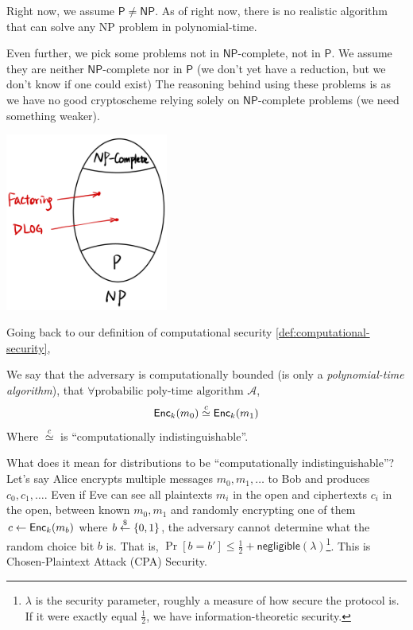 Right now, we assume $\mathsf{P}\neq\mathsf{NP}$. As of right now, there is no realistic algorithm that can solve any \textsf{NP} problem in polynomial-time.

Even further, we pick some problems not in $\mathsf{NP}$-complete, not in $\mathsf{P}$. We assume they are neither $\mathsf{NP}$-complete nor in $\mathsf{P}$ (we don't yet have a reduction, but we don't know if one could exist) The reasoning behind using these problems is as we have no good cryptoscheme relying solely on $\mathsf{NP}$-complete problems (we need something weaker).

\begin{center}
    \includegraphics[width=0.4\textwidth]{images/2023-01-31/pnp-venn.png}
\end{center}

Going back to our definition of computational security \cref{def:computational-security},
\begin{definition*}
    We say that the adversary is computationally bounded (is only a \emph{polynomial-time algorithm}), that $\forall \text{probabilic poly-time algorithm }\mathcal{A}$,
    \[\operatorname{\mathsf{Enc}}_k(m_0)\overset{c}{\simeq}\operatorname{\mathsf{Enc}}_k(m_1)\]
    Where $\overset{c}{\simeq}$ is ``computationally indistinguishable''.
\end{definition*}

What does it mean for distributions to be ``computationally indistinguishable''? Let's say Alice encrypts multiple messages $m_0, m_1, \dots$ to Bob and produces $c_0, c_1, \dots$. Even if Eve can see all plaintexts $m_i$ in the open and ciphertexts $c_i$ in the open, between known $m_0, m_1$ and randomly encrypting one of them $c\leftarrow \operatorname{\mathsf{Enc}}_{k}(m_b)$ where $b\overset{\$}{\leftarrow} \{0, 1\}$, the adversary cannot determine what the random choice bit $b$ is. That is, $\Pr[b = b'] \leq \frac{1}{2} + \mathsf{negligible}(\lambda)$\footnote{$\lambda$ is the security parameter, roughly a measure of how secure the protocol is. If it were exactly equal $\frac{1}{2}$, we have information-theoretic security.}. This is Chosen-Plaintext Attack (CPA) Security.

